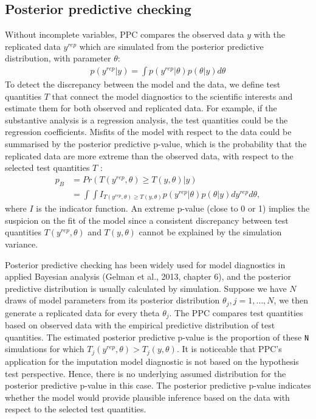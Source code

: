 \documentclass[12pt, fullpage, a4paper]{article}
\begin{document}
\subsection{Posterior predictive checking}
Without incomplete variables, PPC compares the observed data $y$ with the replicated data $y^{rep}$ which are simulated from the posterior predictive distribution, with parameter $\theta$:
\begin{equation}
	\begin{array}{ll}
		p(y^{rep}|y) = \int p(y^{rep}|\theta)p(\theta|y)d\theta
	\end{array} 
\end{equation}
To detect the discrepancy between the model and the data, we define test quantities $T$ that connect the model diagnostics to the scientific interests and estimate them for both observed and replicated data. For example, if the substantive analysis is a regression analysis, the test quantities could be the regression coefficients. Misfits of the model with respect to the data could be summarised by the posterior predictive p-value, which is the probability that the replicated data are more extreme than the observed data, with respect to the selected test quantities $T$ \cite{gelman2013bayesian}:
\begin{equation}
	\begin{array}{ll}
		p_{B} &= Pr(T(y^{rep}, \theta) \ge T(y, \theta)|y)\\
		&= \int\int I_{T(y^{rep}, \theta) \ge T(y, \theta)}p(y^{rep}|\theta)p(\theta|y)dy^{rep}d\theta,
	\end{array} 
\end{equation}
where $I$ is the indicator function. An extreme p-value (close to 0 or 1) implies the suspicion on the fit of the model since a consistent discrepancy between test quantities $T(y^{rep}, \theta)$ and $T(y, \theta)$ cannot be explained by the simulation variance. 

Posterior predictive checking has been widely used for model diagnostics in applied Bayesian analysis (Gelman et al., 2013, chapter 6), and the posterior predictive distribution is usually calculated by simulation. Suppose we have $N$ draws of model parameters from its posterior distribution $\theta_j, j=1,\dots,N$, we then generate a replicated data for every theta $\theta_j$. The PPC compares test quantities based on observed data with the empirical predictive distribution of test quantities. The estimated posterior predictive p-value is the proportion of these \texttt{N} simulations for which $T_{j}(y^{rep}, \theta) > T_{j}(y, \theta)$. It is noticeable that PPC's application for the imputation model diagnostic is not based on the hypothesis test perspective. Hence, there is no underlying assumed distribution for the posterior predictive p-value in this case. The posterior predictive p-value indicates whether the model would provide plausible inference based on the data with respect to the selected test quantities.
\end{document}
